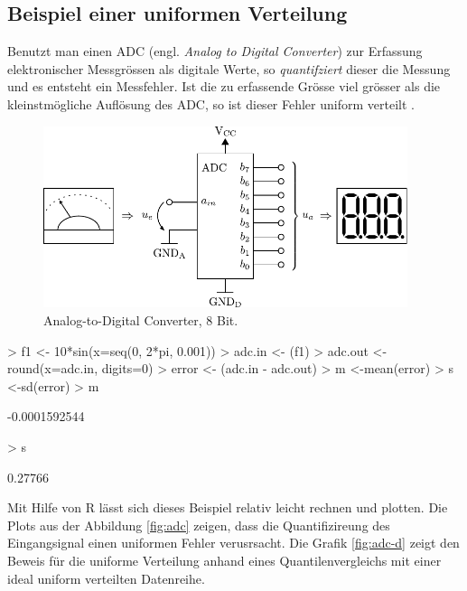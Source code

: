 \clearpage
\subsection{Beispiel einer uniformen Verteilung}
Benutzt man einen ADC (engl. \emph{Analog to Digital Converter}) zur 
Erfassung elektronischer Messgrössen als digitale Werte, so 
\emph{quantifziert} dieser die Messung und es entsteht ein Messfehler. 
Ist die zu erfassende Grösse viel grösser als die kleinstmögliche 
Auflösung des ADC, so ist dieser Fehler uniform verteilt 
\parencite[615]{taoe}.

\begin{figure}[h!]
	\centering
	\includegraphics[width=0.95\textwidth]{adc-system.pdf}
	\caption{Analog-to-Digital Converter, 8 Bit.}
\end{figure}

\begin{Schunk}
\begin{Sinput}
> f1 <- 10*sin(x=seq(0, 2*pi, 0.001))
> adc.in  <- (f1)
> adc.out <- round(x=adc.in, digits=0)
> error   <- (adc.in - adc.out)
> m <-mean(error)
> s <-sd(error)
> m
\end{Sinput}
\begin{Soutput}
[1] -0.0001592544
\end{Soutput}
\begin{Sinput}
> s
\end{Sinput}
\begin{Soutput}
[1] 0.27766
\end{Soutput}
\end{Schunk}

\noindent
Mit Hilfe von R lässt sich dieses Beispiel relativ leicht rechnen und
plotten. Die Plots aus der Abbildung \ref{fig:adc} zeigen, dass die 
Quantifizireung des Eingangsignal einen uniformen Fehler verusrsacht.
Die Grafik \ref{fig:adc-d} zeigt den Beweis für die uniforme Verteilung
anhand eines Quantilenvergleichs mit einer ideal uniform verteilten
Datenreihe.





